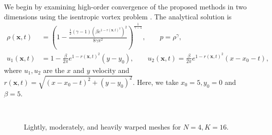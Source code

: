 \documentclass[review,onefignum,onetabnum,final]{siamart171218}
\newcommand{\LRp}[1]{\left( #1 \right)}
\begin{document}
We begin by examining high-order convergence of the proposed methods in two dimensions using the isentropic vortex problem \cite{shu1998essentially, crean2017high}.  The analytical solution is 
\begin{align}
\rho(\bm{x},t) &= \LRp{1 - \frac{\frac{1}{2}(\gamma-1)(\beta e^{1-r(\bm{x},t)^2})^2}{8\gamma \pi^2}}^{\frac{1}{\gamma-1}}, \qquad p = \rho^{\gamma},\\
u_1(\bm{x},t) &= 1 - \frac{\beta}{2\pi} e^{1-r(\bm{x},t)^2}(y-y_0), \qquad u_2(\bm{x},t) = \frac{\beta}{2\pi} e^{1-r(\bm{x},t)^2}(x-x_0-t),\nonumber
\end{align}
where $u_1, u_2$ are the $x$ and $y$ velocity and $r(\bm{x},t) = \sqrt{(x-x_0-t)^2 + (y-y_0)^2}$.  Here, we take $x_0 = 5, y_0 = 0$ and $\beta = 5$.  

\begin{figure}
\centering
{}
\hspace{1em}
\\
\caption{Lightly, moderately, and heavily warped meshes for $N=4, K= 16$.  }
\label{fig:warp2d}
\end{figure}
\end{document}
